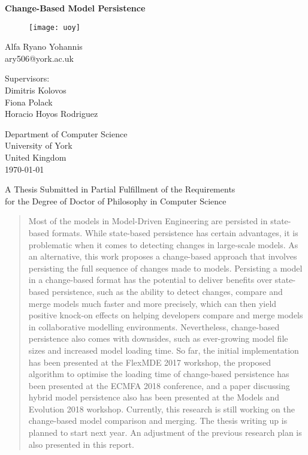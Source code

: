 \documentclass[12pt, a4paper]{report} \usepackage[titletoc]{appendix}
\begin{document}
\begin{titlepage}
\begin{center}

\textbf{\large Change-Based Model Persistence}

\vfill
\begin{figure}[ht]
\centering
\texttt{[image: uoy]}
\label{fig:uoy}
\end{figure}
\vfill

Alfa Ryano Yohannis\\
ary506@york.ac.uk

\vspace{1cm}

Supervisors:\\
Dimitris Kolovos\\
Fiona Polack\\
Horacio Hoyos Rodriguez
\vspace{1cm}

Department of Computer Science\\
University of York\\
United Kingdom\\
\vspace{1cm}
\today

\vfill
A Thesis Submitted in Partial Fulfillment of the Requirements\\
for the Degree of Doctor of Philosophy in Computer Science


\end{center}
\end{titlepage}


\begin{abstract}
\label{abstract}
Most of the models in Model-Driven Engineering are persisted in state-based formats. While state-based persistence has certain advantages, it is problematic when it comes to detecting changes in large-scale models. As an alternative, this work proposes a change-based approach that involves persisting the full sequence of changes made to models. Persisting a model in a change-based format has the potential to deliver benefits over state-based persistence, such as the ability to detect changes, compare and merge models much faster and more precisely, which can then yield positive knock-on effects on helping developers compare and merge models in collaborative modelling environments. Nevertheless, change-based persistence also comes with downsides, such as ever-growing model file sizes and increased model loading time. So far, the initial implementation has been presented at the FlexMDE 2017 workshop, the proposed algorithm to optimise the loading time of change-based persistence has been presented at the ECMFA 2018 conference, and a paper discussing hybrid model persistence also has been presented at the Models and Evolution 2018 workshop. Currently, this research is still working on the change-based model comparison and merging. The thesis writing up is planned to start next year. An adjustment of the previous research plan is also presented in this report.
\end{abstract}
\end{document}
